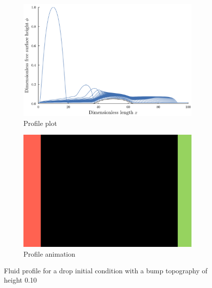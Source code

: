 \begin{frame}
    \begin{figure}
        \centering
        \begin{subfigure}[ht]{.5\textwidth}
            \includegraphics[width=\textwidth]{images/bump_10/plt_notitle.png}
            \caption{Profile plot}
            \label{fig:drop_10_profile}
        \end{subfigure}%
        \begin{subfigure}[ht]{.5\textwidth}
            \includegraphics[width=\textwidth]{images/placeholder.png}
            \caption{Profile animation}
            \label{fig:drop_10_anim}
        \end{subfigure}
        \caption{Fluid profile for a drop initial condition with a bump topography of height 0.10} 
    \end{figure}
\end{frame} 